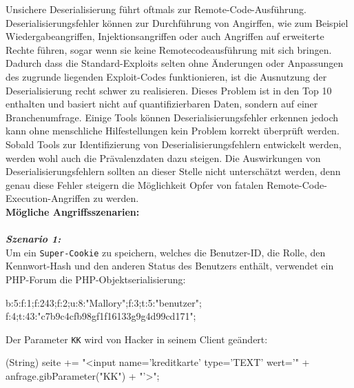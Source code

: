 Unsichere Deserialisierung führt oftmals zur Remote-Code-Ausführung. Deserialisierungsfehler können zur Durchführung von Angirffen, wie zum Beispiel Wiedergabeangriffen, Injektionsangriffen oder auch Angriffen auf erweiterte Rechte führen, sogar wenn sie keine Remotecodeausführung mit sich bringen\cite[6]{owasp17top10}. Dadurch dass die Standard-Exploits selten ohne Änderungen oder Anpassungen des zugrunde liegenden Exploit-Codes funktionieren, ist die Ausnutzung der Deserialisierung recht schwer zu realisieren. Dieses Problem ist in den Top 10 enthalten und basiert nicht auf quantifizierbaren Daten, sondern auf einer Branchenumfrage. Einige Tools können Deserialisierungsfehler erkennen jedoch kann ohne menschliche Hilfestellungen kein Problem korrekt überprüft werden. Sobald Tools zur Identifizierung von Deserialisierungsfehlern entwickelt werden, werden wohl auch die Prävalenzdaten dazu steigen. Die Auswirkungen von Deserialisierungsfehlern sollten an dieser Stelle nicht unterschätzt werden, denn genau diese Fehler steigern die Möglichkeit Opfer von fatalen Remote-Code-Execution-Angriffen zu werden\cite[13]{owasp17top10}.\\

\textbf{Mögliche Angriffsszenarien:}\\
\\
\textbf{\textit{Szenario 1:}}\\

Um ein \texttt{Super-Cookie} zu speichern, welches die Benutzer-ID, die Rolle, den Kennwort-Hash und den anderen Status des Benutzers enthält, verwendet ein PHP-Forum die PHP-Objektserialisierung\cite[13]{owasp17top10}:\\

\begin{LaTeXCode}[caption={Unsichere Deserialisierung - Beispiel 1},captionpos=b, label=LaTeXCode:ud1][numbers=none]
b:5:{f:1;f:243;f:2;u:8:"Mallory";f:3;t:5:"benutzer";
f:4;t:43:"c7b9c4cfb98gf1f16133g9g4d99cd171";}
\end{LaTeXCode}

Der Parameter \texttt{KK} wird von Hacker in seinem Client geändert:\\

\begin{LaTeXCode}[caption={Unsichere Deserialisierung - Beispiel 2},captionpos=b, label=LaTeXCode:ud2][numbers=none]
	(String) seite += "<input name='kreditkarte' type='TEXT'
	wert='" + anfrage.gibParameter("KK") + "'>";
\end{LaTeXCode}

